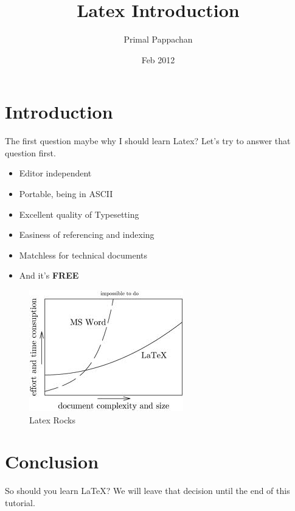 \documentclass{article}
\title{Latex Introduction}
\author{Primal Pappachan}
\date{Feb 2012}
\begin{document}
\maketitle

\section{Introduction}
The first question maybe why I should learn Latex? Let's try to answer that question first.
\begin{itemize}
\item Editor independent
\item Portable, being in ASCII
\item Excellent quality of Typesetting
\item Easiness of referencing and indexing
\item Matchless for technical documents
\item And it's \textbf{FREE}
\end{itemize}


\begin{figure}[h!]
\centering
\includegraphics[scale=1]{latex.jpeg}
\caption{Latex Rocks}
\end{figure}

\section{Conclusion}
So should you learn \LaTeX? We will leave that decision until the end of this tutorial.
\end{document}
